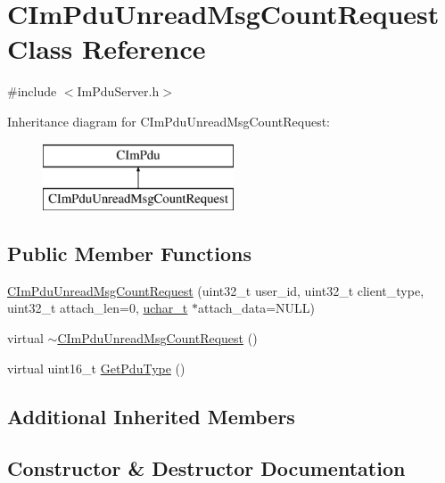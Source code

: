 \hypertarget{class_c_im_pdu_unread_msg_count_request}{}\section{C\+Im\+Pdu\+Unread\+Msg\+Count\+Request Class Reference}
\label{class_c_im_pdu_unread_msg_count_request}


{\ttfamily \#include $<$Im\+Pdu\+Server.\+h$>$}

Inheritance diagram for C\+Im\+Pdu\+Unread\+Msg\+Count\+Request\+:\begin{figure}[H]
\begin{center}
\leavevmode
\includegraphics[height=2.000000cm]{class_c_im_pdu_unread_msg_count_request}
\end{center}
\end{figure}
\subsection*{Public Member Functions}
\begin{DoxyCompactItemize}
\item 
\hyperlink{class_c_im_pdu_unread_msg_count_request_a8f10c67626f93b039ef54bf5ed8ceb62}{C\+Im\+Pdu\+Unread\+Msg\+Count\+Request} (uint32\+\_\+t user\+\_\+id, uint32\+\_\+t client\+\_\+type, uint32\+\_\+t attach\+\_\+len=0, \hyperlink{base_2ostype_8h_a124ea0f8f4a23a0a286b5582137f0b8d}{uchar\+\_\+t} $\ast$attach\+\_\+data=N\+U\+L\+L)
\item 
virtual \hyperlink{class_c_im_pdu_unread_msg_count_request_a672a8744e202d249854998acffa0e41c}{$\sim$\+C\+Im\+Pdu\+Unread\+Msg\+Count\+Request} ()
\item 
virtual uint16\+\_\+t \hyperlink{class_c_im_pdu_unread_msg_count_request_aebde2374689f6b66e4f776c50dddc792}{Get\+Pdu\+Type} ()
\end{DoxyCompactItemize}
\subsection*{Additional Inherited Members}


\subsection{Constructor \& Destructor Documentation}
\hypertarget{class_c_im_pdu_unread_msg_count_request_a8f10c67626f93b039ef54bf5ed8ceb62}{}
